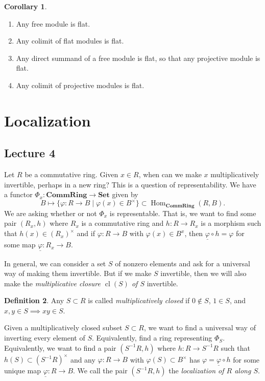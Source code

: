 \documentclass[10pt,letterpaper,cm]{nupset}
\theoremstyle{definition}
\newtheorem{definition}{Definition}[subsection]
\theoremstyle{theorem}
\newtheorem{corollary}[definition]{Corollary}
\theoremstyle{remark}
\newcommand{\1}{\mathbf{1}}
\newcommand{\0}{\vec 0}
\DeclareMathOperator{\cl}{cl}
\DeclareMathOperator{\Hom}{Hom}
\begin{document}
\begin{corollary} $ $
\begin{enumerate}
\item Any free module is flat.
\item Any colimit of flat modules is flat.
\item Any direct summand of a free module is flat, so that any projective module is flat.
\item Any colimit of projective modules is flat. 
\end{enumerate}
\end{corollary}

\section{Localization}

\subsection{Lecture 4}

Let $R$ be a commutative ring. Given $x\in R$, when can we make $x$ multiplicatively invertible, perhaps in a new ring? This is a question of representability. We have a functor $\Phi_x : \mathbf{CommRing} \to \mathbf{Set}$ given by $$B \mapsto \{\varphi : R \to B \mid \varphi(x) \in B^{\times}\} \subset \Hom_{\mathbf{CommRing}}(R, B).$$ We are asking whether or not $\Phi_x$ is representable. That is, we want to find some pair $(R_x, h)$ where $R_x$ is a commutative ring and $h: R \to R_x$ is a morphism such that $h(x) \in (R_x)^{\times}$ and if $\varphi : R \to B$ with $\varphi(x) \in B^x$, then $\underline{\varphi}  \circ h= \varphi$ for some  map $\underline{\varphi} : R_x \to B$.

In general, we can consider a set $S$ of nonzero elements and ask for a universal way of making them invertible. But if we make $S$ invertible, then we will also make the \textit{multiplicative closure $\cl(S)$ of $S$} invertible.

\begin{definition}
Any $S\subset R$ is called \textit{multiplicatively closed} if $0\notin S$, $1\in S$, and $x,y\in S \implies xy\in S$.
\end{definition}

Given a multiplicatively closed subset $S \subset R$, we want to find a universal way of inverting every element of $S$. Equivalently, find a ring representing $\Phi_S$. Equivalently, we want to find a pair $(S^{-1}R, h)$ where  $h: R\to S^{-1}R$ such that $h(S) \subset (S^{-1}R)^{\times}$ and any $\varphi : R \to B$ with $\varphi(S) \subset B^{\times}$ has $\varphi = \underline{\varphi} \circ h$ for some unique map $ \underline{\varphi} : R \to B$.  We call the pair $(S^{-1}R, h)$ the \textit{localization of $R$ along $S$}.
\end{document}

